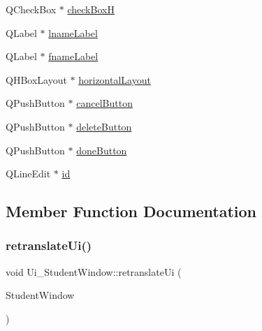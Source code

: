 \begin{DoxyCompactItemize}
\item 
Q\+Check\+Box $\ast$ \hyperlink{class_ui___student_window_a0a29c58db559627bd963a6551bf48158}{check\+BoxH}
\item 
Q\+Label $\ast$ \hyperlink{class_ui___student_window_ac9c45d6f80c2ebf13c93826709b0f513}{lname\+Label}
\item 
Q\+Label $\ast$ \hyperlink{class_ui___student_window_aa1dc16dd68103467ec0b63d00de85209}{fname\+Label}
\item 
Q\+H\+Box\+Layout $\ast$ \hyperlink{class_ui___student_window_ae446b53e4c7de296020a36edb8f0411d}{horizontal\+Layout}
\item 
Q\+Push\+Button $\ast$ \hyperlink{class_ui___student_window_a15d7948def7dfb885368c796f4e2b76b}{cancel\+Button}
\item 
Q\+Push\+Button $\ast$ \hyperlink{class_ui___student_window_abbcec10eb031bf4c8963bbc3008c4281}{delete\+Button}
\item 
Q\+Push\+Button $\ast$ \hyperlink{class_ui___student_window_a3717318e7751ac23de3c95cb36c03214}{done\+Button}
\item 
Q\+Line\+Edit $\ast$ \hyperlink{class_ui___student_window_aa49ce03dcf5c4bea7d75fbbd17f4ac2c}{id}
\end{DoxyCompactItemize}


\subsection{Member Function Documentation}
\mbox{\label{class_ui___student_window_a1fc2da528074f28be5f44ef85b95085f}} 
\subsubsection{\texorpdfstring{retranslate\+Ui()}{retranslateUi()}}
{\footnotesize\ttfamily void Ui\+\_\+\+Student\+Window\+::retranslate\+Ui (\begin{DoxyParamCaption}\item[{Q\+Main\+Window $\ast$}]{Student\+Window }\end{DoxyParamCaption})\hspace{0.3cm}{\ttfamily [inline]}}

